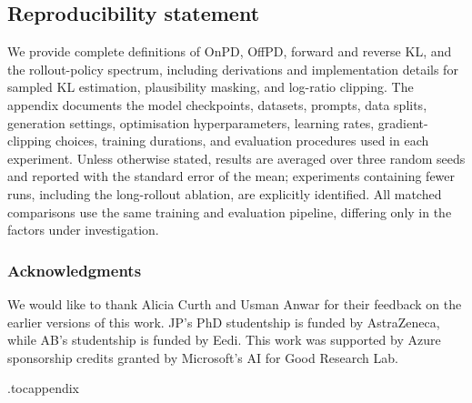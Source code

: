 \documentclass{article} %
\theoremstyle{plain}
\theoremstyle{definition}
\theoremstyle{remark}
\begin{document}
\subsection*{Reproducibility statement}

We provide complete definitions of OnPD, OffPD, forward and reverse KL, and the rollout-policy spectrum, including derivations and implementation details for sampled KL estimation, plausibility masking, and log-ratio clipping. The appendix documents the model checkpoints, datasets, prompts, data splits, generation settings, optimisation hyperparameters, learning rates, gradient-clipping choices, training durations, and evaluation procedures used in each experiment. Unless otherwise stated, results are averaged over three random seeds and reported with the standard error of the mean; experiments containing fewer runs, including the long-rollout ablation, are explicitly identified. All matched comparisons use the same training and evaluation pipeline, differing only in the factors under investigation.


\subsubsection*{Acknowledgments}
We would like to thank Alicia Curth and Usman Anwar for their feedback on the earlier versions of this work. JP's PhD studentship is funded by AstraZeneca, while AB's studentship is funded by Eedi. This work was supported by Azure sponsorship credits granted by Microsoft’s AI for Good Research Lab.






\clearpage
\appendix
\onecolumn
\etocdepthtag.toc{appendix}

\begingroup
    \tableofcontents
\endgroup
\end{document}
